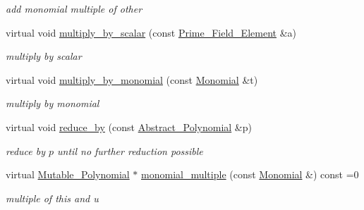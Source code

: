 \begin{Indent}
\begin{DoxyCompactItemize}
\begin{DoxyCompactList}\small\item\em add monomial multiple of other \end{DoxyCompactList}\item 
\mbox{\label{class_mutable___polynomial_a19f2326427ab08d6dc160c5eca898529}} 
virtual void \hyperlink{class_mutable___polynomial_a19f2326427ab08d6dc160c5eca898529}{multiply\+\_\+by\+\_\+scalar} (const \hyperlink{class_prime___field___element}{Prime\+\_\+\+Field\+\_\+\+Element} \&a)
\begin{DoxyCompactList}\small\item\em multiply by scalar \end{DoxyCompactList}\item 
\mbox{\label{class_mutable___polynomial_a97a3ca070811ac495e8f22c3d7623225}} 
virtual void \hyperlink{class_mutable___polynomial_a97a3ca070811ac495e8f22c3d7623225}{multiply\+\_\+by\+\_\+monomial} (const \hyperlink{class_monomial}{Monomial} \&t)
\begin{DoxyCompactList}\small\item\em multiply by monomial \end{DoxyCompactList}\item 
\mbox{\label{class_mutable___polynomial_a0f40d2041aa5c3447324bde0c14049e2}} 
virtual void \hyperlink{class_mutable___polynomial_a0f40d2041aa5c3447324bde0c14049e2}{reduce\+\_\+by} (const \hyperlink{class_abstract___polynomial}{Abstract\+\_\+\+Polynomial} \&p)
\begin{DoxyCompactList}\small\item\em reduce by $p$ until no further reduction possible \end{DoxyCompactList}\item 
\mbox{\label{class_mutable___polynomial_a828c980c211687bcf752ed0562a1961e}} 
virtual \hyperlink{class_mutable___polynomial}{Mutable\+\_\+\+Polynomial} $\ast$ \hyperlink{class_mutable___polynomial_a828c980c211687bcf752ed0562a1961e}{monomial\+\_\+multiple} (const \hyperlink{class_monomial}{Monomial} \&) const =0
\begin{DoxyCompactList}\small\item\em multiple of this and u \end{DoxyCompactList}\item 

\end{DoxyCompactItemize}
\end{Indent}

